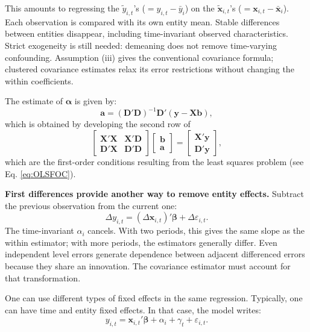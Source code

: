 \documentclass[
  11pt,
]{book}
\theoremstyle{definition}
\theoremstyle{definition}
\theoremstyle{definition}
\theoremstyle{definition}
\theoremstyle{remark}
\begin{document}
This amounts to regressing the \(\tilde{y}_{i,t}\)'s (\(= y_{i,t} - \bar{y}_i\)) on the \(\tilde{\mathbf{x}}_{i,t}\)'s (\(=\mathbf{x}_{i,t} - \bar{\mathbf{x}}_i\)). Each observation is compared with its own entity mean. Stable differences between entities disappear, including time-invariant observed characteristics. Strict exogeneity is still needed: demeaning does not remove time-varying confounding. Assumption (iii) gives the conventional covariance formula; clustered covariance estimates relax its error restrictions without changing the within coefficients.

The estimate of \(\boldsymbol\alpha\) is given by:
\begin{equation}
\boxed{\mathbf{a} = (\mathbf{D}'\mathbf{D})^{-1}\mathbf{D}'(\mathbf{y} - \mathbf{X}\mathbf{b}),} \label{eq:a}
\end{equation}
which is obtained by developing the second row of
\[
\left[
\begin{array}{cc}
\mathbf{X}'\mathbf{X} & \mathbf{X}'\mathbf{D}\\
\mathbf{D}'\mathbf{X} & \mathbf{D}'\mathbf{D}
\end{array}\right]
\left[
\begin{array}{c}
\mathbf{b}\\
\mathbf{a}
\end{array}\right] =
\left[
\begin{array}{c}
\mathbf{X}'\mathbf{y}\\
\mathbf{D}'\mathbf{y}
\end{array}\right],
\]
which are the first-order conditions resulting from the least squares problem (see Eq. \eqref{eq:OLSFOC}).

\textbf{First differences provide another way to remove entity effects.} Subtract the previous observation from the current one:
\[
\Delta y_{i,t}=(\Delta\mathbf{x}_{i,t})'\boldsymbol\beta+\Delta\varepsilon_{i,t}.
\]
The time-invariant \(\alpha_i\) cancels. With two periods, this gives the same slope as the within estimator; with more periods, the estimators generally differ. Even independent level errors generate dependence between adjacent differenced errors because they share an innovation. The covariance estimator must account for that transformation.

One can use different types of fixed effects in the same regression. Typically, one can have time and entity fixed effects. In that case, the model writes:
\[
y_{i,t} = \mathbf{x}_{i,t}'\boldsymbol\beta + \alpha_i + \gamma_t + \varepsilon_{i,t}.
\]
\end{document}
